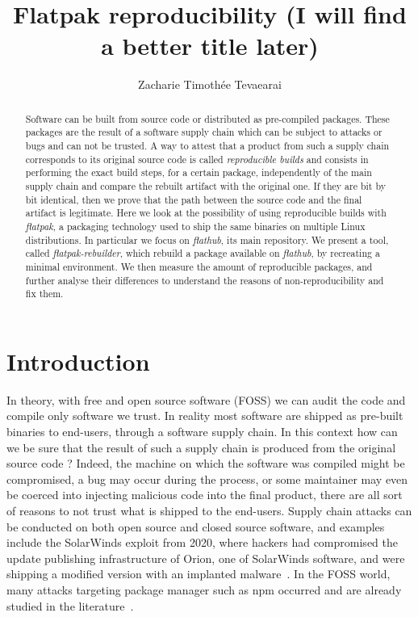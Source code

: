 \documentclass[a4paper,11pt,oneside]{report}
\title{Flatpak reproducibility (I will find a better title later)}
\author{Zacharie Timothée Tevaearai}
\theoremstyle{definition}
\newcommand{\sysname}{\emph{flatpak-rebuilder}\xspace}
\newcommand{\rb}{\emph{reproducible builds}\xspace}
\newcommand{\fp}{\emph{flatpak}\xspace}
\newcommand{\fh}{\emph{flathub}\xspace}
\begin{document}
\maketitle

\begin{abstract}
Software can be built from source code or distributed as pre-compiled packages.
    These packages are the result of a software supply chain which can be
    subject to attacks or bugs and can not be trusted. A way to attest that a
    product from such a supply chain corresponds to its original source code is
    called \rb and consists in performing the exact build steps, for a certain
    package, independently of the main supply chain and compare the rebuilt
    artifact with the original one. If they are bit by bit identical, then we
    prove that the path between the source code and the final artifact is
    legitimate. Here we look at the possibility of using reproducible builds
    with \fp, a packaging technology used to ship the same binaries on multiple
    Linux distributions. In particular we focus on \fh, its main repository. We
    present a tool, called \sysname, which rebuild a package available on \fh,
    by recreating a minimal environment. We then measure the amount of
    reproducible packages, and further analyse their differences to understand
    the reasons of non-reproducibility and fix them.
\end{abstract}

\maketoc

\chapter{Introduction}

In theory, with free and open source software (FOSS) we can audit the code and
compile only software we trust. In reality most software are shipped as
pre-built binaries to end-users, through a software supply chain. In this
context how can we be sure that the result of such a supply chain is produced
from the original source code ? Indeed, the machine on which the software was
compiled might be compromised, a bug may occur during the process, or some
maintainer may even be coerced into injecting malicious code into the final
product, there are all sort of reasons to not trust what is shipped to the
end-users. Supply chain attacks can be conducted on both open source and closed
source software, and examples include the SolarWinds exploit from 2020, where
hackers had compromised the update publishing infrastructure of Orion, one of
SolarWinds software, and were shipping a modified version with an implanted
malware~\cite{enwiki:solarwinds}. In the FOSS world, many attacks targeting
package manager such as npm occurred and are already studied in the
literature~\cite{10.1007/978-3-030-52683-2_2}.
\end{document}
